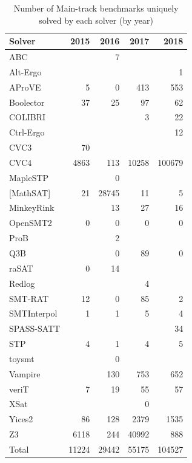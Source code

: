 \documentclass[dvipsnames,table,twoside,11pt]{article}
\begin{document}
\begin{table}
  \caption{Number of Main-track benchmarks uniquely solved by each
    solver (by year)}
  \label{table:unique-solutions}
  \centering
  \begin{tabular}{lrrrr}
    \toprule
    Solver & 2015 & 2016 & 2017 & 2018 \\
    \midrule
    ABC               &       & 7     &       &        \\
    Alt-Ergo          &       &       &       & 1      \\
    AProVE            & 5     & 0     & 413   & 553    \\
    Boolector         & 37    & 25    & 97    & 62     \\
    COLIBRI           &       &       & 3     & 22     \\
    Ctrl-Ergo         &       &       &       & 12     \\
    CVC3              & 70    &       &       &        \\
    CVC4              & 4863  & 113   & 10258 & 100679 \\
    MapleSTP          &       & 0     &       &        \\
    {[}MathSAT{]}     & 21    & 28745 & 11    & 5      \\
    MinkeyRink        &       & 13    & 27    & 16     \\
    OpenSMT2          & 0     & 0     & 0     & 0      \\
    ProB              &       & 2     &       &        \\
    Q3B               &       & 0     & 89    & 0      \\
    raSAT             & 0     & 14    &       &        \\
    Redlog            &       &       & 4     &        \\
    SMT-RAT           & 12    & 0     & 85    & 2      \\
    SMTInterpol       & 1     & 1     & 5     & 4      \\
    SPASS-SATT        &       &       &       & 34     \\
    STP               & 4     & 1     & 4     & 5      \\
    toysmt            &       & 0     &       &        \\
    Vampire           &       & 130   & 753   & 652    \\
    veriT             & 7     & 19    & 55    & 57     \\
    XSat              &       &       & 0     &        \\
    Yices2            & 86    & 128   & 2379  & 1535   \\
    Z3                & 6118  & 244   & 40992 & 888    \\
    \midrule
    Total             & 11224 & 29442 & 55175 & 104527 \\
    \bottomrule
  \end{tabular}
\end{table}
\end{document}
